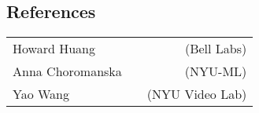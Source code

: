 \documentclass[]{deedy-resume-openfont}
\begin{document}
\begin{minipage}[t]{0.36\textwidth}
\subsection{References}
\noindent\begin{tabular}{@{}lcr}
Howard Huang &\hspace{1em} &(Bell Labs)   \\
Anna Choromanska & \hspace{1em} &(NYU-ML)     \\
Yao Wang &\hspace{1em} &(NYU Video Lab)             \\
\end{tabular}








%
%

\end{minipage} 
\hfill
\begin{minipage}[t]{0.03\textwidth} 
\hfill
\end{minipage} 
\end{document}
